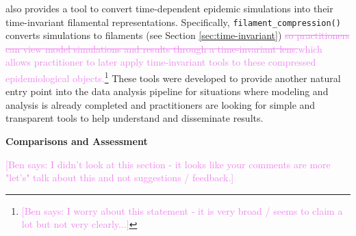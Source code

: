 \documentclass[
  shortnames]{jss}
\begin{document}
 also provides a tool to convert time-dependent epidemic
simulations into their time-invariant filamental representations.
Specifically, \texttt{filament\_compression()} converts simulations to
filaments (see Section \ref{sec:time-invariant})
\textcolor{violet}{\sout{so practitioners can view model simulations and results through a time-invariant lens.}which allows practitioner to later apply time-invariant tools to these compressed epidemiological objects.}\footnote{\textcolor{violet}{[Ben says: I worry about this statement - it is very broad / seems to claim a lot but not very clearly...]}}
These tools were developed to provide another natural entry point into
the  data analysis pipeline for situations where
modeling and analysis is already completed and practitioners are looking
for simple and transparent tools to help understand and disseminate
results.

\textbf{Comparisons and Assessment}

\textcolor{violet}{[Ben says: I didn't look at this section - it looks like your comments are more "let's" talk about this and not suggestions / feedback.]}
\end{document}
